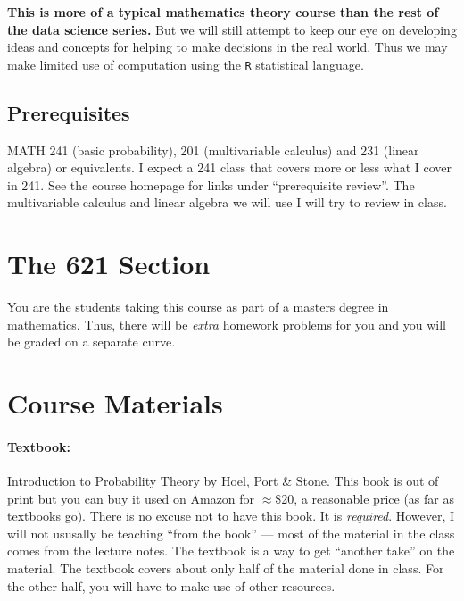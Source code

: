 \documentclass[12pt]{article}
\newcommand{\qu}[1]{``#1''}
\begin{document}
\textbf{This is more of a typical mathematics theory course than the rest of the data science series.} But we will still attempt to keep our eye on developing ideas and concepts for helping to make decisions in the real world. Thus we may make limited use of computation using the \texttt{R} statistical language.

\subsection*{Prerequisites}

MATH 241 (basic probability), 201 (multivariable calculus) and 231 (linear algebra) or equivalents. I expect a 241 class that covers more or less what I cover in 241. See the course homepage for links under \qu{prerequisite review}. The multivariable calculus and linear algebra we will use I will try to review in class.

\section*{The 621 Section}

You are the students taking this course as part of a masters degree in mathematics. Thus, there will be \textit{extra} homework problems for you and you will be graded on a separate curve.

\section*{Course Materials}

\paragraph{Textbook:} Introduction to Probability Theory by Hoel, Port \& Stone. This book is out of print but you can buy it used on \href{https://www.amazon.com/Introduction-Probability-Theory-Paul-Hoel/dp/039504636X/ref=sr_1_1?ie=UTF8&qid=1503515517&sr=8-1&keywords=introduction+to+probability+theory+hoel}{Amazon} for $\approx$\$20, a reasonable price (as far as textbooks go). There is no excuse not to have this book. It is \textit{required}. However, I will not ususally be teaching \qu{from the book} --- most of the material in the class comes from the lecture notes. The textbook is a way to get ``another take'' on the material. The textbook covers about only half of the material done in class. For the other half, you will have to make use of other resources.
\end{document}
